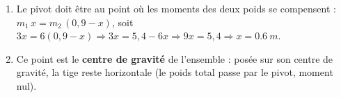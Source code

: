 \documentclass[11pt,a4paper]{article}
\begin{document}
\begin{corrige}
\begin{enumerate}[label=\alph*)]
  \item Le pivot doit être au point où les moments des deux poids se compensent :
        $m_1\,x = m_2\,(0{,}9-x)$, soit $3x = 6(0{,}9-x) \Rightarrow 3x = 5{,}4-6x \Rightarrow 9x=5{,}4
        \Rightarrow x=\qty{0.6}{m}$.
  \item Ce point est le \textbf{centre de gravité} de l'ensemble : posée sur son centre de gravité, la
        tige reste horizontale (le poids total passe par le pivot, moment nul).
\end{enumerate}
\end{corrige}
\end{document}

